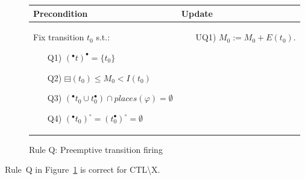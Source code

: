 \begin{figure}[h!]
    \begin{adjustbox}{center}
        \begin{tabular}{|p{65mm}|p{45mm}|} \hline
        Precondition & Update \\ \hline
        Fix transition $t_0$ s.t.:
        \begin{itemize}[leftmargin=10mm]
            \item[Q1)] $({}^\bullet t)^\bullet = \{t_0\}$
            \item[Q2)] $\boxminus(t_0) \leq M_0 < I(t_0)$
            \item[Q3)] $({}^\bullet t_0 \cup t_0^\bullet) \cap
            places(\varphi) = \emptyset$
            \item[Q4)] $({}^\bullet t_0)^\circ = (t_0^\bullet)^\circ = \emptyset$
        \end{itemize}
        &
        \begin{itemize}[leftmargin=10mm]
            \item[UQ1)] $M_0:=M_0 + E(t_0)$.
        \end{itemize} \\ \hline
        \end{tabular}
    \end{adjustbox}
    \caption{Rule Q: Preemptive transition firing}
    \label{fig:rule_q}
\end{figure}

\begin{theorem}
    Rule~Q in Figure~\ref{fig:rule_q} is correct for CTL\textbackslash X.
\end{theorem}
